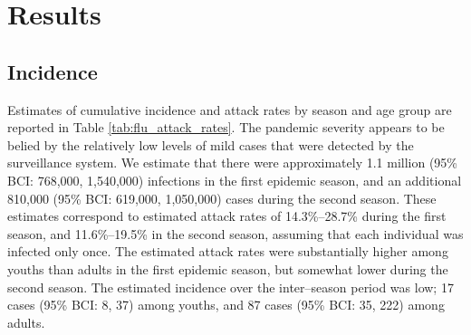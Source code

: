 \section{Results}
\label{sec:flu_results}

\subsection{Incidence}
\label{subsec:flu_incid_res}
Estimates of cumulative incidence and attack rates by season and age group are reported in Table \ref{tab:flu_attack_rates}. The pandemic severity appears to be belied by the relatively low levels of mild cases that were detected by the surveillance system. We estimate that there were approximately 1.1 million (95\% BCI: 768,000, 1,540,000) infections in the first epidemic season, and an additional 810,000 (95\% BCI: 619,000, 1,050,000) cases during the second season. These estimates correspond to estimated attack rates of 14.3\%--28.7\% during the first season, and 11.6\%--19.5\% in the second season, assuming that each individual was infected only once. The estimated attack rates were substantially higher among youths than adults in the first epidemic season, but somewhat lower during the second season. The estimated incidence over the inter--season period was low; 17 cases (95\% BCI: 8, 37) among youths, and 87 cases (95\% BCI: 35, 222) among adults. 

